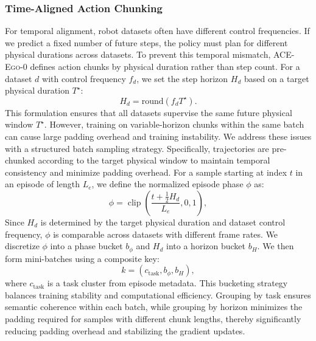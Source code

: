\documentclass{llmxive}
\providecommand{\OURS}{\textsc{ACE-Ego-0}\xspace}
\providecommand{\Ours}{\OURS}
\begin{document}
\subsubsection{Time-Aligned Action Chunking}
\label{sec:time-aligned-dynamic-chunking}

For temporal alignment, robot datasets often have different control frequencies.
If we predict a fixed number of future steps, the policy must plan for different physical durations across datasets. To prevent this temporal mismatch, \Ours defines action chunks by physical duration rather than step count.
For a dataset \(d\) with control frequency \(f_d\), we set the step horizon \(H_d\) based on a target physical duration \(T^\star\):
\begin{equation}
H_d = \mathrm{round}\!\left(f_d T^\star\right).
\label{eq:horizon}
\end{equation}
This formulation ensures that all datasets supervise the same future physical window \(T^\star\). However, training on variable-horizon chunks within the same batch can cause large padding overhead and training instability. We address these issues with a structured batch sampling strategy. Specifically, trajectories are pre-chunked according to the target physical window to maintain temporal consistency and minimize padding overhead. For a sample starting at index \(t\) in an episode of length \(L_e\), we define the normalized episode phase \(\phi\) as:
\begin{equation}
\phi = \operatorname{clip}\!\left( \frac{t + \tfrac{1}{2}H_d}{L_e}, 0, 1 \right),
\label{eq:episode-phase}
\end{equation}
Since \(H_d\) is determined by the target physical duration and dataset control frequency, \(\phi\) is comparable across datasets with different frame rates. We discretize \(\phi\) into a phase bucket \(b_{\phi}\) and \(H_d\) into a horizon bucket \(b_H\). We then form mini-batches using a composite key:
\begin{equation}
k = \left(c_{\mathrm{task}}, b_{\phi}, b_H\right),
\label{eq:batch-key}
\end{equation}
where \(c_{\mathrm{task}}\) is a task cluster from episode metadata. 
This bucketing strategy balances training stability and computational efficiency. Grouping by task ensures semantic coherence within each batch, while grouping by horizon minimizes the padding required for samples with different chunk lengths, thereby significantly reducing padding overhead and stabilizing the gradient updates.
\end{document}
